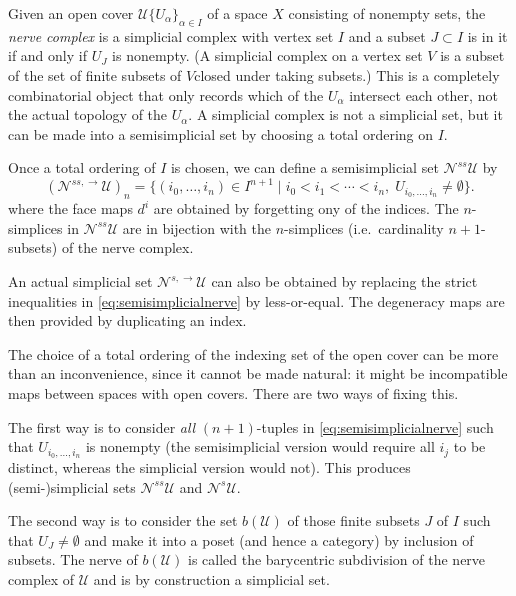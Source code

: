 \documentclass[a4paper,openany]{scrbook}
\begin{document}
Given an open cover $\mathcal U\{U_\alpha\}_{\alpha \in I}$ of a space $X$ consisting of nonempty sets, the \emph{nerve complex} is a simplicial complex with vertex set $I$ and a subset $J\subset I$ is in it if and only if $U_J$ is nonempty. (A simplicial complex on a vertex set $V$ is a subset of the set of finite subsets of $V$closed under taking subsets.) This is a completely combinatorial object that only records which of the $U_\alpha$ intersect each other, not the actual topology of the $U_\alpha$.
A simplicial complex is not a simplicial set, but it can be made into a semisimplicial set by choosing a total ordering on $I$.

Once a total ordering of $I$ is chosen, we can define a semisimplicial set $\mathcal N^{ss}\mathcal U$ by
\begin{equation}\label{eq:semisimplicialnerve}
(\mathcal N^{ss,\to}\mathcal U)_n = \{ (i_0,\dots,i_n) \in I^{n+1} \mid i_0 < i_1 < \cdots < i_n,\; U_{i_0,\dots,i_n} \neq \emptyset\}.
\end{equation}
where the face maps $d^i$ are obtained by forgetting ony of the indices. The $n$-simplices in $\mathcal N^{ss}\mathcal U$ are in bijection with the $n$-simplices (i.e.\ cardinality $n+1$-subsets) of the nerve complex.

An actual simplicial set $\mathcal N^{s,\to}\mathcal U$ can also be obtained by replacing the strict inequalities in \eqref{eq:semisimplicialnerve} by less-or-equal. The degeneracy maps are then provided by duplicating an index.

The choice of a total ordering of the indexing set of the open cover can be more than an inconvenience, since it cannot be made natural: it might be incompatible maps between spaces with open covers. There are two ways of fixing this. 

The first way is to consider \emph{all} $(n+1)$-tuples in \eqref{eq:semisimplicialnerve} such that $U_{i_0,\dots,i_n}$ is nonempty (the semisimplicial version would require all $i_j$ to be distinct, whereas the simplicial version would not). This produces (semi-)simplicial sets $\mathcal N^{ss}\mathcal U$ and $\mathcal N^s\mathcal U$.

The second way is to consider the set $b(\mathcal U)$ of those finite subsets $J$ of $I$ such that $U_J \neq \emptyset$ and make it into a poset (and hence a category) by inclusion of subsets. 
The nerve of $b(\mathcal U)$ is called the barycentric subdivision of the nerve complex of $\mathcal U$ and is by construction a simplicial set.
\end{document}
